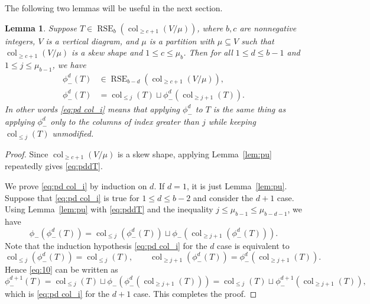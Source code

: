 \documentclass{amsart}
\numberwithin{equation}{section}
\newtheorem{lem}[thm]{Lemma}
\theoremstyle{definition}
\newcommand\col{\operatorname{col}}
\newcommand\pu{\phi_-}
\newcommand\RSE{\operatorname{RSE}}
\begin{document}
The following two lemmas will be useful in the next section. 

\begin{lem}\label{lem:pd2}
  Suppose $T\in\RSE_{b}(\col_{\ge c+1}(V/\mu))$, where $b,c$ are nonnegative
  integers, $V$ is a vertical diagram, and $\mu$ is a partition with
  $\mu\subseteq V$ such that $\col_{\ge c+1}(V/\mu)$ is a skew shape and $1\le
  c\le\mu_b$. Then for all $1\le d\le b-1$ and $1\le j\le \mu_{b-1}$, we have
  \begin{align}
    \label{eq:pddT}
    \pu^d(T)&\in \RSE_{b-d}(\col_{\ge c+1}(V/\mu)),\\
    \label{eq:pd col_i}
    \pu^d(T) &= \col_{\le j}(T) \sqcup \pu^d(\col_{\ge j+1}(T)).        
  \end{align}
  In other words \eqref{eq:pd col_i} means that applying $\pu^d$ to $T$ is the same
  thing as applying $\pu^d$ only to the columns of index greater than $j$
  while keeping $\col_{\le j}(T)$ unmodified.
\end{lem}
\begin{proof}
  Since $\col_{\ge c+1}(V/\mu)$ is a skew shape, applying Lemma~\ref{lem:pu}
  repeatedly gives \eqref{eq:pddT}.

  We prove \eqref{eq:pd col_i} by induction on $d$. If $d=1$, it is just
  Lemma~\ref{lem:pu}. Suppose that \eqref{eq:pd col_i} is true for $1\le d\le
  b-2$ and consider the $d+1$ case. Using Lemma~\ref{lem:pu} with
  \eqref{eq:pddT} and the inequality $j\le\mu_{b-1}\le \mu_{b-d-1}$, we have
  \begin{equation}
    \label{eq:10}
\pu(\pu^d(T)) = \col_{\le j}(\pu^d(T))\sqcup \pu(\col_{\ge j+1}(\pu^d(T))).     
  \end{equation}
Note that the induction hypothesis \eqref{eq:pd col_i} for the $d$ case is
equivalent to
\[
\col_{\le j}(\pu^d(T)) = \col_{\le j}(T), \qquad
\col_{\ge j+1}(\pu^d(T)) = \pu^d(\col_{\ge j+1}(T)). 
\]
Hence \eqref{eq:10} can be written as
\[
  \pu^{d+1}(T) = \col_{\le j}(T)\sqcup \pu(\pu^d(\col_{\ge j+1}(T)))
  = \col_{\le j}(T)\sqcup \pu^{d+1}(\col_{\ge j+1}(T)),
\]
which is \eqref{eq:pd col_i} for the $d+1$ case. 
This completes the proof. 
\end{proof}
\end{document}
